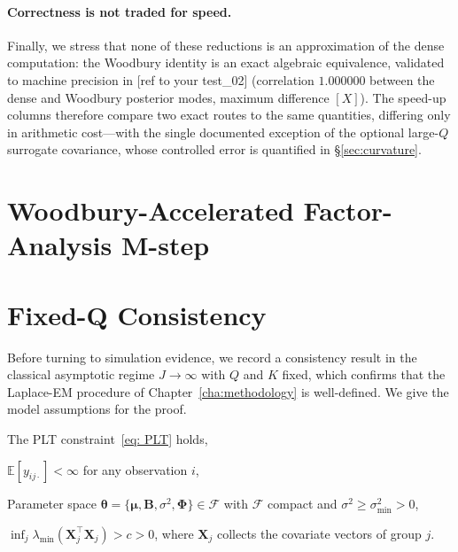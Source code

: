 \paragraph{Correctness is not traded for speed.}
Finally, we stress that none of these reductions is an approximation of the dense computation:
the Woodbury identity is an exact algebraic equivalence, validated to machine precision in
[ref to your test\_02] (correlation $1.000000$ between the dense and Woodbury posterior modes,
maximum difference $[X]$). The speed-up columns therefore compare two exact routes to the same
quantities, differing only in arithmetic cost---with the single documented exception of the
optional large-$Q$ surrogate covariance, whose controlled error is quantified in
\S\ref{sec:curvature}.
\fi



\iffalse
\section{Woodbury-Accelerated Factor-Analysis M-step}
\label{sec:woodbury-accelerated-factor-analysis}

\section{Fixed-Q Consistency}
\label{sec:fixed-q-consistency}

Before turning to simulation evidence, we record a consistency result in the classical asymptotic regime $J\to \infty$ with $Q$ and $K$ fixed, which confirms that the Laplace-EM procedure of Chapter~\ref{cha:methodology} is well-defined. We give the model assumptions for the proof. 

\begin{assumption}[Identifiability]
    The PLT constraint~\eqref{eq: PLT} holds,
\end{assumption}

\begin{assumption}
    $\mathbb{E}[y_{ij\cdot}]<\infty$ for any observation $i$,
\end{assumption}

\begin{assumption}
    Parameter space $\bm{\theta}=\{\bm{\mu},\mathbf{B},\sigma^{2},\bm{\Phi}\}\in \mathcal{F}$ with $\mathcal{F}$ compact and $\sigma^{2}\geq \sigma^{2}_{\text{min}}>0$,
\end{assumption}

\begin{assumption}
    $\inf_{j}\lambda_{\text{min}}(\mathbf{X}_{j}^{\top}\mathbf{X}_{j})>c>0$, where $\mathbf{X}_{j}$ collects the covariate vectors of group $j$.
\end{assumption}

